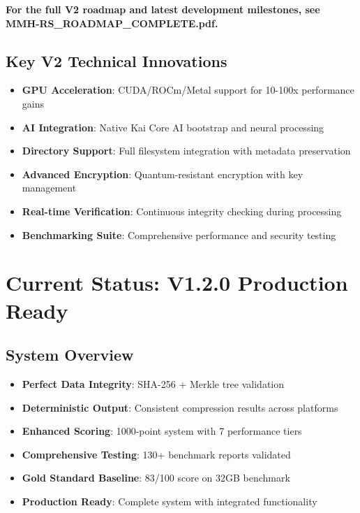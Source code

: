 \documentclass[12pt,a4paper]{article}
\begin{document}
\textbf{For the full V2 roadmap and latest development milestones, see MMH-RS\_ROADMAP\_COMPLETE.pdf.}

\subsection{Key V2 Technical Innovations}
\begin{itemize}
    \item \textbf{GPU Acceleration}: CUDA/ROCm/Metal support for 10-100x performance gains
    \item \textbf{AI Integration}: Native Kai Core AI bootstrap and neural processing
    \item \textbf{Directory Support}: Full filesystem integration with metadata preservation
    \item \textbf{Advanced Encryption}: Quantum-resistant encryption with key management
    \item \textbf{Real-time Verification}: Continuous integrity checking during processing
    \item \textbf{Benchmarking Suite}: Comprehensive performance and security testing
\end{itemize}

\section{Current Status: V1.2.0 Production Ready}

\subsection{System Overview}
\begin{itemize}
    \item \textbf{Perfect Data Integrity}: SHA-256 + Merkle tree validation
    \item \textbf{Deterministic Output}: Consistent compression results across platforms
    \item \textbf{Enhanced Scoring}: 1000-point system with 7 performance tiers
    \item \textbf{Comprehensive Testing}: 130+ benchmark reports validated
    \item \textbf{Gold Standard Baseline}: 83/100 score on 32GB benchmark
    \item \textbf{Production Ready}: Complete system with integrated functionality
\end{itemize}
\end{document}
